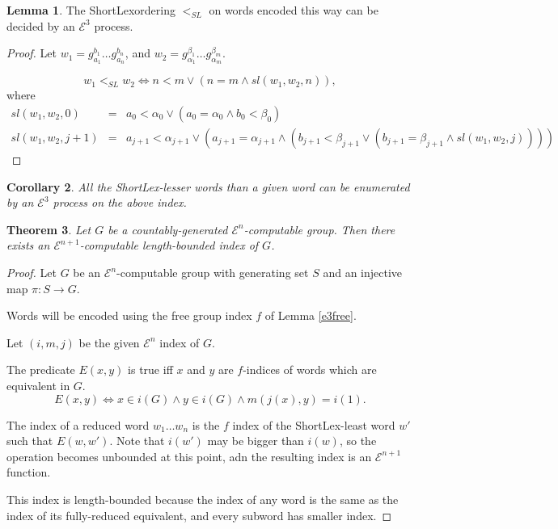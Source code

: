 \documentclass[a4paper]{article}
\newcommand{\grz}[1]{$\mathcal{E}^{#1}$}
\newcommand{\shortlex}{{\sf ShortLex}\;}
\theoremstyle{plain}
\newtheorem{theorem}{Theorem}[section]
\newtheorem{corollary}[theorem]{Corollary}
\theoremstyle{definition}
\newtheorem{lemma}[theorem]{Lemma}
\begin{document}
\begin{lemma}
	The \shortlex ordering $<_{SL}$ on words encoded this way can be decided by an \grz{3} process.
\end{lemma}

\begin{proof}
Let $w_1 = g_{a_1}^{b_1} \dots g_{a_n}^{b_n}$, and $w_2 = g_{\alpha_1}^{\beta_1} \dots g_{\alpha_m}^{\beta_m}$.

\[w_1<_{SL}w_2 \Leftrightarrow n<m \vee \left ( n=m \wedge sl(w_1,w_2,n) \right ) ,\]
where
\begin{eqnarray*}
	sl(w_1,w_2,0) &=& a_0<\alpha_0 \vee (a_0 = \alpha_0 \wedge b_0 < \beta_0) \\
	sl(w_1,w_2,{j+1}) &=& a_{j+1}<\alpha_{j+1} \vee \left ( a_{j+1} = \alpha_{j+1} \wedge (b_{j+1} < \beta_{j+1} \vee (b_{j+1}=\beta_{j+1} \wedge sl(w_1,w_2,j))) \right )
\end{eqnarray*}
\end{proof}

\begin{corollary}
	All the \shortlex-lesser words than a given word can be enumerated by an \grz{3} process on the above index.
\end{corollary}


\begin{theorem}
	Let $G$ be a countably-generated \grz{n}-computable group. Then there exists an \grz{n+1}-computable length-bounded index of $G$.
\end{theorem}

\begin{proof}
	Let $G$ be an \grz{n}-computable group with generating set $S$ and an injective map $\pi: S \rightarrow G$.
	
	Words will be encoded using the free group index $f$ of Lemma \ref{e3free}.

	Let $(i,m,j)$ be the given \grz{n} index of $G$. 

	The predicate $E(x,y)$ is true iff $x$ and $y$ are $f$-indices of words which are equivalent in $G$.
	\[ E(x,y) \Leftrightarrow x \in i(G) \wedge y \in i(G) \wedge m(j(x),y) = i(1). \]

	The index of a reduced word $w_1 \dots w_n$ is the $f$ index of the \shortlex-least word $w'$ such that $E(w,w')$. Note that $i(w')$ may be bigger than $i(w)$, so the operation becomes unbounded at this point, adn the resulting index is an \grz{n+1} function.

	This index is length-bounded because the index of any word is the same as the index of its fully-reduced equivalent, and every subword has smaller index.
\end{proof}
\end{document}
